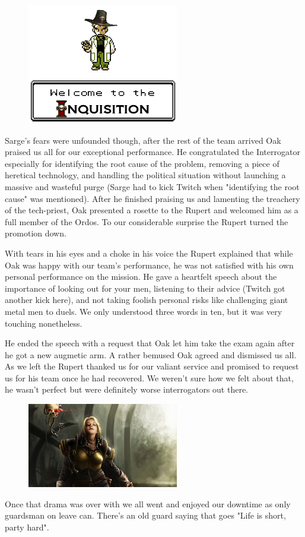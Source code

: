 \begin{figure}
	\begin{center}
		\includegraphics[width=\figwidth]{pics/4/35.png}
	\end{center}
\end{figure}
Sarge's fears were unfounded though, after the rest of the team arrived Oak praised us all for our exceptional performance. 
He congratulated the Interrogator especially for identifying the root cause of the problem, removing a piece of heretical technology, and handling the political situation without launching a massive and wasteful purge (Sarge had to kick Twitch when "identifying the root cause" was mentioned). 
After he finished praising us and lamenting the treachery of the tech-priest, Oak presented a rosette to the Rupert and welcomed him as a full member of the Ordos. 
To our considerable surprise the Rupert turned the promotion down.

With tears in his eyes and a choke in his voice the Rupert explained that while Oak was happy with our team's performance, he was not satisfied with his own personal performance on the mission. 
He gave a heartfelt speech about the importance of looking out for your men, listening to their advice (Twitch got another kick here), and not taking foolish personal risks like challenging giant metal men to duels. 
We only understood three words in ten, but it was very touching nonetheless.

He ended the speech with a request that Oak let him take the exam again after he got a new augmetic arm. 
A rather bemused Oak agreed and dismissed us all. 
As we left the Rupert thanked us for our valiant service and promised to request us for his team once he had recovered. 
We weren't sure how we felt about that, he wasn't perfect but were definitely worse interrogators out there.

\begin{figure}
	\begin{center}
		\includegraphics[width=\figwidth]{pics/4/36.png}
	\end{center}
\end{figure}
Once that drama was over with we all went and enjoyed our downtime as only guardsman on leave can. 
There's an old guard saying that goes "Life is short, party hard". 

